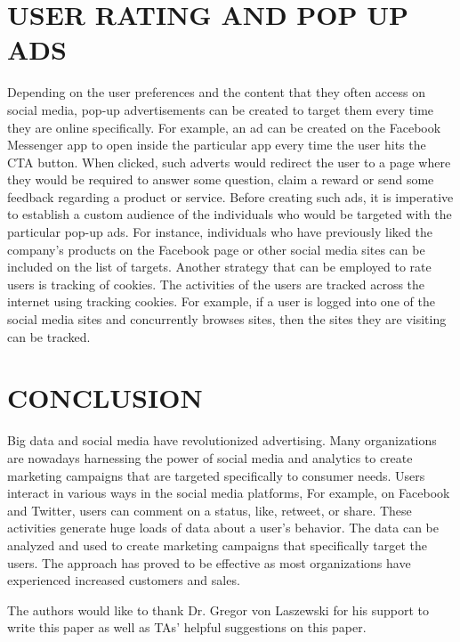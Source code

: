 \documentclass[sigconf]{acmart}
\begin{document}
\section{USER RATING AND POP UP ADS}
Depending on the user preferences and the content that they often access on social media, pop-up advertisements can be created to target them every time they are online specifically. For example, an ad can be created on the Facebook Messenger app to open inside the particular app every time the user hits the CTA button. When clicked, such adverts would redirect the user to a page where they would be required to answer some question, claim a reward or send some feedback regarding a product or service. Before creating such ads, it is imperative to establish a custom audience of the individuals who would be targeted with the particular pop-up ads. For instance, individuals who have previously liked the company’s products on the Facebook page or other social media sites can be included on the list of targets. Another strategy that can be employed to rate users is tracking of cookies. The activities of the users are tracked across the internet using tracking cookies. For example, if a user is logged into one of the social media sites and concurrently browses sites, then the sites they are visiting can be tracked.

\section{CONCLUSION}
Big data and social media have revolutionized advertising. Many organizations are nowadays harnessing the power of social media and analytics to create marketing campaigns that are targeted specifically to consumer needs. Users interact in various ways in the social media platforms, For example, on Facebook and Twitter, users can comment on a status, like, retweet, or share. These activities generate huge loads of data about a user’s behavior. The data can be analyzed and used to create marketing campaigns that specifically target the users. The approach has proved to be effective as most organizations have experienced increased customers and sales.

\begin{acks}

  The authors would like to thank Dr. Gregor von Laszewski for his support to write this paper as well as TAs' helpful suggestions on this paper. 

\end{acks}


 


\end{document}
